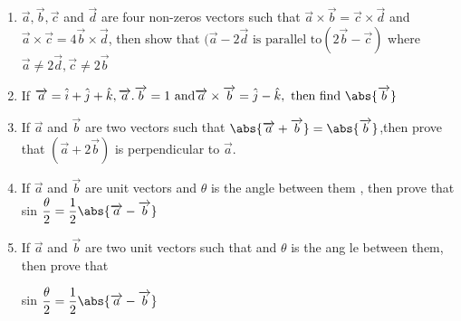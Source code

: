 \begin{enumerate}
\item $\overrightarrow{a}, \overrightarrow{ b },\overrightarrow{ c }$  and  $\overrightarrow{ d }$ are four non-zeros vectors such that  $\overrightarrow{a}\times \overrightarrow{b}= \overrightarrow{c} \times \overrightarrow{d}$  and  $\overrightarrow{a} \times \overrightarrow{c} = 4\overrightarrow{b} \times \overrightarrow{d}$, then show that  $(\overrightarrow{ a}-2\overrightarrow{d} \text{ is parallel to}(2\overrightarrow{b}-\overrightarrow{c})$ where $\overrightarrow{a} \neq 2\overrightarrow{d}, \overrightarrow{c} \neq 2\overrightarrow{b}$
\item If $\overrightarrow{a} = \hat{i} + \hat{ j} + \hat{ k} , \overrightarrow{a} . \overrightarrow{b} = 1 \text{ and} \overrightarrow{a} \times \overrightarrow{b} = \hat{j} - \hat{k}, \text { then find } \abs{\overrightarrow{b}}$
\item  If $\overrightarrow{ a}$  and  $\overrightarrow{b}$  are two vectors such that $\abs{\overrightarrow{a} + \overrightarrow{b}} = \abs{ \overrightarrow{b}}$,then prove that $(\overrightarrow{a} + 2\overrightarrow{b})$  is perpendicular to $\overrightarrow{ a}$.
\item If $\overrightarrow{ a}$ and $\overrightarrow{ b}$ are unit vectors and $\theta$ is the angle between them , then prove that sin $\dfrac{\theta}{ 2} = \dfrac{1}{2}\abs{\overrightarrow{ a} - \overrightarrow{ b}}$ 
\item If $\overrightarrow{a}$ and $\overrightarrow{b}$  are two unit vectors such that and $\theta$ is the ang le between them, then prove that
\begin{center}                                         sin $\dfrac{ \theta}{2} = \dfrac{1}{2} \abs{\overrightarrow{a} - \overrightarrow{b}}$\\                      
\end{center}

\end{enumerate}
